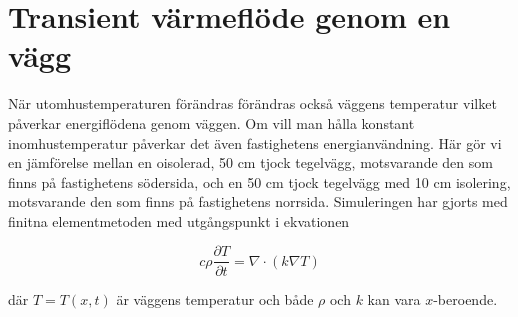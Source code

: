 \section{Transient värmeflöde genom en vägg}

När utomhustemperaturen förändras förändras också väggens temperatur vilket påverkar energiflödena genom väggen. Om vill man hålla konstant inomhustemperatur påverkar det även fastighetens energianvändning. Här gör vi en jämförelse mellan en oisolerad, 50 cm tjock tegelvägg, motsvarande den som finns på fastighetens södersida, och en 50 cm tjock tegelvägg med 10 cm isolering, motsvarande den som finns på fastighetens norrsida. Simuleringen har gjorts med finitna elementmetoden med utgångspunkt i ekvationen

\begin{equation}
c\rho \frac{\partial T}{\partial t} = \nabla \cdot (k \nabla T)
\end{equation}

där $T=T(x,t)$ är väggens temperatur och både $\rho$ och $k$ kan vara $x$-beroende.

